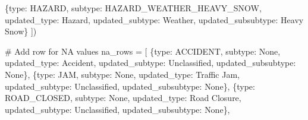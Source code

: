 \documentclass[
  letterpaper,
  DIV=11,
  numbers=noendperiod]{scrartcl}
\newenvironment{Shaded}{\begin{snugshade}}{\end{snugshade}}
\newcommand{\CommentTok}[1]{\textcolor[rgb]{0.37,0.37,0.37}{#1}}
\newcommand{\NormalTok}[1]{\textcolor[rgb]{0.00,0.23,0.31}{#1}}
\newcommand{\OperatorTok}[1]{\textcolor[rgb]{0.37,0.37,0.37}{#1}}
\newcommand{\StringTok}[1]{\textcolor[rgb]{0.13,0.47,0.30}{#1}}
\newcommand{\VariableTok}[1]{\textcolor[rgb]{0.07,0.07,0.07}{#1}}
\begin{document}
\begin{Shaded}
\begin{Highlighting}[]
\NormalTok{    \{}\StringTok{\textquotesingle{}type\textquotesingle{}}\NormalTok{: }\StringTok{\textquotesingle{}HAZARD\textquotesingle{}}\NormalTok{, }\StringTok{\textquotesingle{}subtype\textquotesingle{}}\NormalTok{: }\StringTok{\textquotesingle{}HAZARD\_WEATHER\_HEAVY\_SNOW\textquotesingle{}}\NormalTok{, }
     \StringTok{\textquotesingle{}updated\_type\textquotesingle{}}\NormalTok{: }\StringTok{\textquotesingle{}Hazard\textquotesingle{}}\NormalTok{, }\StringTok{\textquotesingle{}updated\_subtype\textquotesingle{}}\NormalTok{: }\StringTok{\textquotesingle{}Weather\textquotesingle{}}\NormalTok{, }\StringTok{\textquotesingle{}updated\_subsubtype\textquotesingle{}}\NormalTok{: }\StringTok{\textquotesingle{}Heavy Snow\textquotesingle{}}\NormalTok{\}}
\NormalTok{])}

\CommentTok{\# Add row for NA values}
\NormalTok{na\_rows }\OperatorTok{=}\NormalTok{ [}
\NormalTok{    \{}\StringTok{\textquotesingle{}type\textquotesingle{}}\NormalTok{: }\StringTok{\textquotesingle{}ACCIDENT\textquotesingle{}}\NormalTok{, }\StringTok{\textquotesingle{}subtype\textquotesingle{}}\NormalTok{: }\VariableTok{None}\NormalTok{, }
     \StringTok{\textquotesingle{}updated\_type\textquotesingle{}}\NormalTok{: }\StringTok{\textquotesingle{}Accident\textquotesingle{}}\NormalTok{, }\StringTok{\textquotesingle{}updated\_subtype\textquotesingle{}}\NormalTok{: }\StringTok{\textquotesingle{}Unclassified\textquotesingle{}}\NormalTok{, }\StringTok{\textquotesingle{}updated\_subsubtype\textquotesingle{}}\NormalTok{: }\VariableTok{None}\NormalTok{\},}
\NormalTok{    \{}\StringTok{\textquotesingle{}type\textquotesingle{}}\NormalTok{: }\StringTok{\textquotesingle{}JAM\textquotesingle{}}\NormalTok{, }\StringTok{\textquotesingle{}subtype\textquotesingle{}}\NormalTok{: }\VariableTok{None}\NormalTok{, }
     \StringTok{\textquotesingle{}updated\_type\textquotesingle{}}\NormalTok{: }\StringTok{\textquotesingle{}Traffic Jam\textquotesingle{}}\NormalTok{, }\StringTok{\textquotesingle{}updated\_subtype\textquotesingle{}}\NormalTok{: }\StringTok{\textquotesingle{}Unclassified\textquotesingle{}}\NormalTok{, }\StringTok{\textquotesingle{}updated\_subsubtype\textquotesingle{}}\NormalTok{: }\VariableTok{None}\NormalTok{\},}
\NormalTok{    \{}\StringTok{\textquotesingle{}type\textquotesingle{}}\NormalTok{: }\StringTok{\textquotesingle{}ROAD\_CLOSED\textquotesingle{}}\NormalTok{, }\StringTok{\textquotesingle{}subtype\textquotesingle{}}\NormalTok{: }\VariableTok{None}\NormalTok{, }
     \StringTok{\textquotesingle{}updated\_type\textquotesingle{}}\NormalTok{: }\StringTok{\textquotesingle{}Road Closure\textquotesingle{}}\NormalTok{, }\StringTok{\textquotesingle{}updated\_subtype\textquotesingle{}}\NormalTok{: }\StringTok{\textquotesingle{}Unclassified\textquotesingle{}}\NormalTok{, }\StringTok{\textquotesingle{}updated\_subsubtype\textquotesingle{}}\NormalTok{: }\VariableTok{None}\NormalTok{\},}

\end{Highlighting}
\end{Shaded}
\end{document}
